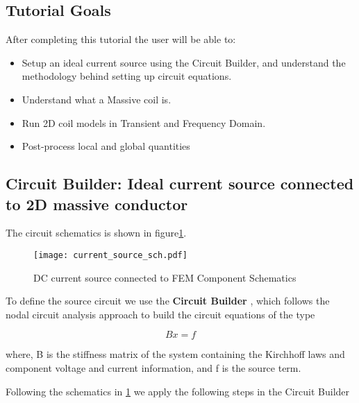 \subsection*{Tutorial Goals}

After completing this tutorial the user will be able to:
\begin{itemize}
  \item Setup an ideal current source using the Circuit Builder, and understand the methodology behind setting up circuit equations.
  \item Understand what a Massive coil is.
  \item Run 2D  coil models in Transient and Frequency Domain.
  \item Post-process local and global quantities
  
\end{itemize}





\subsection*{Circuit Builder:  Ideal current source connected to 2D massive conductor}

The circuit schematics is shown in figure\ref{fg:dc_current_source}.


\begin{figure}[H]
\centering
\texttt{[image: current\_source\_sch.pdf]}
\caption{DC current source connected to FEM Component Schematics}\label{fg:dc_current_source}
\end{figure}  



To define the source circuit we use the \textbf{Circuit Builder} , which follows the nodal circuit analysis approach to build the circuit equations of the type

\begin{equation}
  Bx = f
\end{equation}

where, B is the stiffness matrix of the system containing the Kirchhoff laws and component voltage and current information, and  f is the source term.

Following the schematics in \ref{fg:dc_current_source} we apply the following steps in the Circuit Builder

